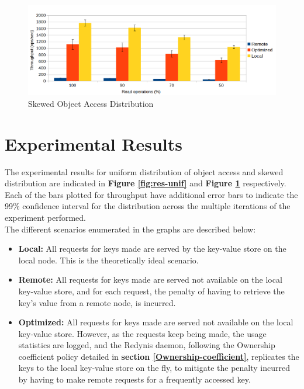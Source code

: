 \documentclass{sig-alternate}
\begin{document}
\begin{figure}[ht]
\centering
\includegraphics[width=\textwidth]{images/Uniform-dist-throughput.png}
\caption{Skewed Object Access Distribution}
\label{fig:res-skew}
\end{figure}


\section{Experimental Results}

The experimental results for uniform distribution of object access and skewed distribution are indicated in \textbf{Figure \ref{fig:res-unif}} and \textbf{Figure \ref{fig:res-skew}} respectively.\\

Each of the bars plotted for throughput have additional error bars to indicate the 99\% confidence interval for the distribution across the multiple iterations of the experiment performed. \\

The different scenarios enumerated in the graphs are described below:
\begin{itemize}
	\item \textbf{Local:} All requests for keys made are served by the key-value store on the local node. This is the theoretically ideal scenario.
	\item \textbf{Remote:} All requests for keys made are served not available on the local key-value store, and for each request, the penalty of having to retrieve the key's value from a remote node, is incurred.
	\item \textbf{Optimized:} All requests for keys made are served not available on the local key-value store. However, as the requests keep being made, the usage statistics are logged, and the Redynis daemon, following the Ownership coefficient policy detailed in \textbf{section \ref{Ownership-coefficient}}, replicates the keys to the local key-value store on the fly, to mitigate the penalty incurred by having to make remote requests for a frequently accessed key.
\end{itemize}
\end{document}
